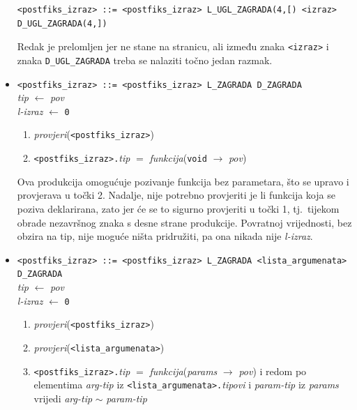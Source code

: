 \documentclass[times, 12pt, utf8]{book}
\begin{document}
\begin{itemize}
\begin{lstlisting}[caption={Ispis semantičkog analizatora za generativno stablo programa \ref{lst:primjer_dvostruko_indeksiranje_in}.},label=lst:primjer_dvostruko_indeksiranje_out]
<postfiks_izraz> ::= <postfiks_izraz> L_UGL_ZAGRADA(4,[) <izraz> D_UGL_ZAGRADA(4,])

\end{lstlisting}

Redak je prelomljen jer ne stane na stranicu, ali između znaka \verb|<izraz>| i znaka \verb|D_UGL_ZAGRADA| treba se nalaziti točno jedan razmak.

\item
\verb|<postfiks_izraz> ::= <postfiks_izraz> L_ZAGRADA D_ZAGRADA|\\
\emph{tip} \(\leftarrow\) \emph{pov}\\
\emph{l-izraz} \(\leftarrow\) \verb|0|
\begin{enumerate}
\item
\emph{provjeri}(\verb|<postfiks_izraz>|)
\item
\verb|<postfiks_izraz>.|\emph{tip} \(=\) \emph{funkcija}(\verb|void| \(\to\) \emph{pov})
\end{enumerate}

Ova produkcija omogućuje pozivanje funkcija bez parametara, što se upravo i provjerava u točki 2.
Nadalje, nije potrebno provjeriti je li funkcija koja se poziva deklarirana, zato jer će se to sigurno provjeriti u točki 1, tj.~tijekom obrade nezavršnog znaka s desne strane produkcije.
Povratnoj vrijednosti, bez obzira na tip, nije moguće ništa pridružiti, pa ona nikada nije \emph{l-izraz}.

\item
\verb|<postfiks_izraz> ::= <postfiks_izraz> L_ZAGRADA <lista_argumenata> D_ZAGRADA|\\
\emph{tip} \(\leftarrow\) \emph{pov}\\
\emph{l-izraz} \(\leftarrow\) \verb|0|
\begin{enumerate}
\item
\emph{provjeri}(\verb|<postfiks_izraz>|)
\item
\emph{provjeri}(\verb|<lista_argumenata>|)
\item
\verb|<postfiks_izraz>.|\emph{tip} \(=\) \emph{funkcija}(\emph{params} \(\to\) \emph{pov}) i redom po elementima \emph{arg-tip} iz \verb|<lista_argumenata>.|\emph{tipovi} i \emph{param-tip} iz \emph{params} vrijedi \emph{arg-tip} \(\sim\) \emph{param-tip}
\end{enumerate}


\end{itemize}
\end{document}

